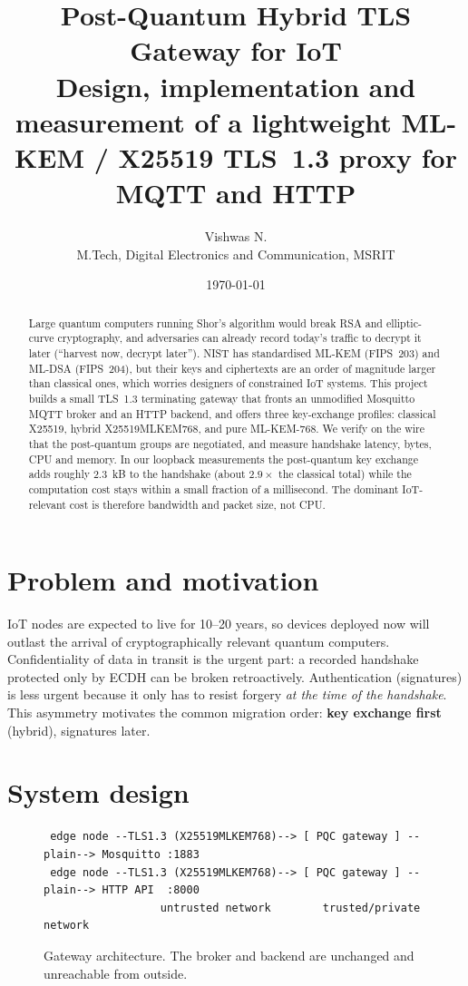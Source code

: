 \documentclass[11pt,a4paper]{article}
\title{Post-Quantum Hybrid TLS Gateway for IoT\\[2pt]
\large Design, implementation and measurement of a lightweight ML-KEM / X25519 TLS~1.3 proxy for MQTT and HTTP}
\author{Vishwas N.\\ M.Tech, Digital Electronics and Communication, MSRIT}
\date{\today}
\newcommand{\mlkem}{ML-KEM-768}
\begin{document}
\maketitle

\begin{abstract}
Large quantum computers running Shor's algorithm would break RSA and elliptic-curve
cryptography, and adversaries can already record today's traffic to decrypt it later
(``harvest now, decrypt later''). NIST has standardised ML-KEM (FIPS~203) and ML-DSA
(FIPS~204), but their keys and ciphertexts are an order of magnitude larger than
classical ones, which worries designers of constrained IoT systems. This project builds
a small TLS~1.3 terminating gateway that fronts an unmodified Mosquitto MQTT broker and
an HTTP backend, and offers three key-exchange profiles: classical X25519, hybrid
X25519MLKEM768, and pure \mlkem. We verify on the wire that the post-quantum groups are
negotiated, and measure handshake latency, bytes, CPU and memory. In our loopback
measurements the post-quantum key exchange adds roughly 2.3~kB to the handshake (about
$2.9\times$ the classical total) while the computation cost stays within a small
fraction of a millisecond. The dominant IoT-relevant cost is therefore bandwidth and
packet size, not CPU.
\end{abstract}

\section{Problem and motivation}
IoT nodes are expected to live for 10--20 years, so devices deployed now will outlast the
arrival of cryptographically relevant quantum computers. Confidentiality of data in
transit is the urgent part: a recorded handshake protected only by ECDH can be broken
retroactively. Authentication (signatures) is less urgent because it only has to resist
forgery \emph{at the time of the handshake}. This asymmetry motivates the common
migration order: \textbf{key exchange first} (hybrid), signatures later.

\section{System design}
\begin{figure}[H]\centering
\begin{lstlisting}
 edge node --TLS1.3 (X25519MLKEM768)--> [ PQC gateway ] --plain--> Mosquitto :1883
 edge node --TLS1.3 (X25519MLKEM768)--> [ PQC gateway ] --plain--> HTTP API  :8000
                  untrusted network        trusted/private network
\end{lstlisting}
\caption{Gateway architecture. The broker and backend are unchanged and unreachable from outside.}
\end{figure}
\end{document}
